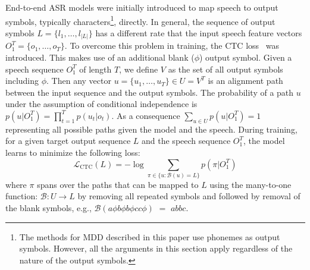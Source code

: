 End-to-end ASR models were initially introduced to map speech to output symbols, typically characters\footnote{The methods for MDD described in this paper use phonemes as output symbols. However, all the arguments in this section apply regardless of the nature of the output symbols.}, directly.
In general, the sequence of output symbols $L = \{l_1, \dots, l_{|L|}\}$ has a different rate that the input speech feature vectors $O_1^T = \{o_1, \dots, o_T\}$.
To overcome this problem in training, the CTC loss~\cite{CTC} was introduced.
This makes use of an additional blank ($\phi$) output symbol.
Given a speech sequence $O_1^T$ of length $T$, we define $V$ as the set of all output symbols including $\phi$.
Then any vector $u = \{u_1, \dots, u_T\} \in U = V^T$ is an alignment path between the input sequence and the output symbols.
The probability of a path $u$ under the assumption of conditional independence is $p(u| O_{1}^{T})=\prod_{t=1}^{T}p(u_t|o_t)$.
As a consequence $\sum_{u \in U}p(u| O_{1}^{T}) = 1$ representing all possible paths given the model and the speech.
During training, for a given target output sequence $L$ and the speech sequence $O_{1}^{T}$, the model learns to minimize the following loss:
\begin{equation}
   \label{eqa:CTC-loss}
    \mathcal{L}_{\text{CTC}}(L) = -\log\sum_{\pi \in {\{u:\mathcal{B}(u) = L\}}} p(\pi|O_1^T) 
\end{equation}
where $\pi$ spans over the paths that can be mapped to $L$ using the many-to-one function: $\mathcal{B}: U \rightarrow L$ by removing all repeated symbols and followed by removal of the blank symbols, e.g., $\mathcal{B}(a{\phi}b{\phi}b{\phi}cc{\phi})$ $=$ $abbc$. 

